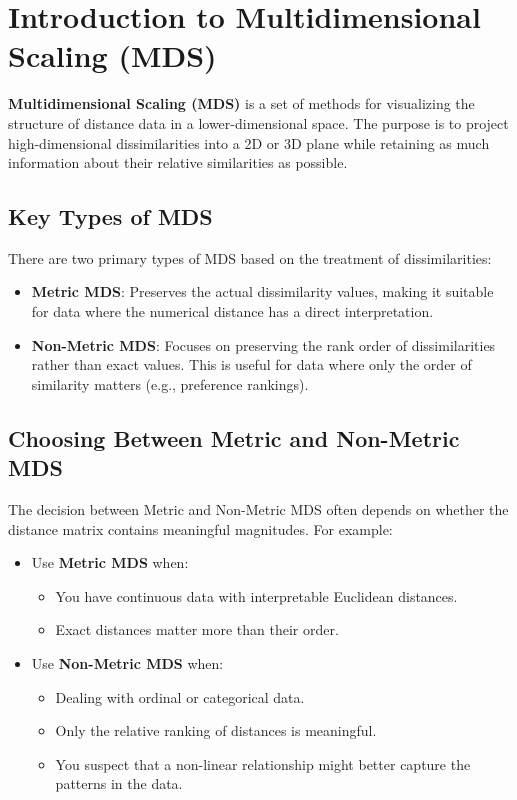 \section{Introduction to Multidimensional Scaling (MDS)}
\textbf{Multidimensional Scaling (MDS)} is a set of methods for visualizing the structure of distance data in a lower-dimensional space. The purpose is to project high-dimensional dissimilarities into a 2D or 3D plane while retaining as much information about their relative similarities as possible.

\subsection{Key Types of MDS}
There are two primary types of MDS based on the treatment of dissimilarities:
\begin{itemize}
    \item \textbf{Metric MDS}: Preserves the actual dissimilarity values, making it suitable for data where the numerical distance has a direct interpretation.
    \item \textbf{Non-Metric MDS}: Focuses on preserving the rank order of dissimilarities rather than exact values. This is useful for data where only the order of similarity matters (e.g., preference rankings).
\end{itemize}

\subsection{Choosing Between Metric and Non-Metric MDS}
The decision between Metric and Non-Metric MDS often depends on whether the distance matrix contains meaningful magnitudes. For example:
\begin{itemize}
    \item Use \textbf{Metric MDS} when:
        \begin{itemize}
            \item You have continuous data with interpretable Euclidean distances.
            \item Exact distances matter more than their order.
        \end{itemize}
    \item Use \textbf{Non-Metric MDS} when:
        \begin{itemize}
            \item Dealing with ordinal or categorical data.
            \item Only the relative ranking of distances is meaningful.
            \item You suspect that a non-linear relationship might better capture the patterns in the data.
        \end{itemize}
\end{itemize}


